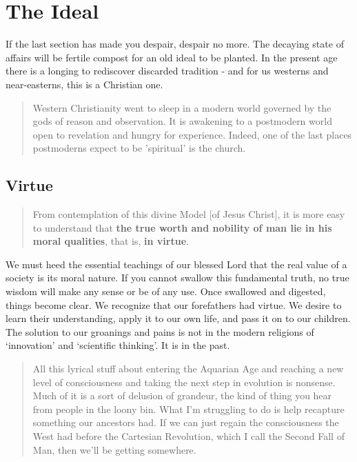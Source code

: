 \documentclass[letterpaper]{article}
\begin{document}
\section{The Ideal}


If the last section has made you despair, despair no more. The decaying state of affairs will be fertile compost for an old ideal to be planted. In the present age there is a longing to rediscover discarded tradition - and for us westerns and near-easterns, this is a Christian one.

\begin{quote}
  Western Christianity went to sleep in a modern world governed by the gods of reason and observation. It is awakening to a postmodern world open to revelation and hungry for experience. Indeed, one of the last places postmoderns expect to be 'spiritual' is the church.
\end{quote}

\subsection{Virtue}

\begin{quote}
  From contemplation of this divine Model [of Jesus Christ], it is more easy to understand that \textbf{the true worth and nobility of man lie in his moral qualities}, that is, \textbf{in virtue}.
\end{quote}

We must heed the essential teachings of our blessed Lord that the real value of a society is its moral nature. If you cannot swallow this fundamental truth, no true wisdom will make any sense or be of any use. Once swallowed and digested, things become clear. We recognize that our forefathers had virtue. We desire to learn their understanding, apply it to our own life, and pass it on to our children. The solution to our groanings and pains is not in the modern religions of `innovation' and `scientific thinking'. It is in the past.

\begin{quote}
  All this lyrical stuff about entering the Aquarian Age and reaching a new level of consciousness and taking the next step in evolution is nonsense. Much of it is a sort of delusion of grandeur, the kind of thing you hear from people in the loony bin. What I'm struggling to do is help recapture something our ancestors had. If we can just regain the consciousness the West had before the Cartesian Revolution, which I call the Second Fall of Man, then we'll be getting somewhere.

\end{quote}
\end{document}
